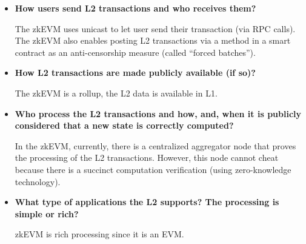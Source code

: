 \begin{itemize}

\item \textbf{How users send L2 transactions and who receives them?}

The zkEVM uses unicast to let user send their transaction (via RPC calls). The zkEVM also enables posting L2 transactions via a method in a smart contract as an anti-censorship measure (called ``forced batches”).

\item \textbf{How L2 transactions are made publicly available (if so)?}

The zkEVM is a rollup, the L2 data is available in L1.

\item \textbf{Who process the L2 transactions and how, and, when it is publicly considered that a new state is correctly computed?}

In the zkEVM, currently, there is a centralized aggregator node that proves the processing of the L2 transactions. However, this node cannot cheat because there is a succinct computation verification (using zero-knowledge technology).

\item \textbf{What type of applications the L2 supports? The processing is simple or rich?}

zkEVM is rich processing since it is an EVM.

\end{itemize}

